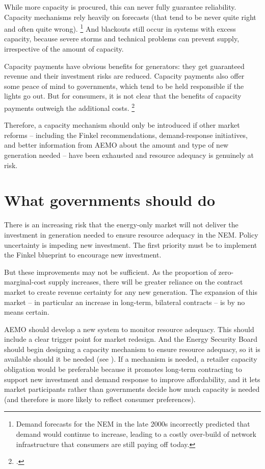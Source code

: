 \documentclass[FrontPage]{grattan}
\begin{document}
While more capacity is procured, this can never fully guarantee reliability. Capacity mechanisms rely heavily on forecasts (that tend to be never quite right and often quite wrong).%
\footnote{\eg{} Demand forecasts for the NEM in the late 2000s incorrectly predicted that demand would continue to increase, leading to a costly over-build of network infrastructure that consumers are still paying off today.}
And blackouts still occur in systems with excess capacity, because severe storms and technical problems can prevent supply, irrespective of the amount of capacity.

Capacity payments have obvious benefits for generators: they get guaranteed revenue and their investment risks are reduced. Capacity payments also offer some peace of mind to governments, which tend to be held responsible if the lights go out. But for consumers, it is not clear that the benefits of capacity payments outweigh the additional costs.%
\footcites{CIGRE2016CapacityMechanisms}{NewberyGrubb2014SecurityOfSupply}{Oxford2016ElectricityMarketsBroken}

Therefore, a capacity mechanism should only be introduced if other market reforms -- including the Finkel recommendations, demand-response initiatives, and better information from AEMO about the amount and type of new generation needed -- have been exhausted and resource adequacy is genuinely at risk.


\chapter{What governments should do}\label{chap:what-governments-should-do}
There is an increasing risk that the energy-only market will not deliver the investment in generation needed to ensure resource adequacy in the NEM\@. Policy uncertainty is impeding new investment. The first priority must be to implement the Finkel blueprint to encourage new investment. 

But these improvements may not be sufficient. As the proportion of zero-marginal-cost supply increases, there will be greater reliance on the contract market to create revenue certainty for any new generation. The expansion of this market -- in particular an increase in long-term, bilateral contracts -- is by no means certain. 

AEMO should develop a new system to monitor resource adequacy. This should include a clear trigger point for market redesign. And the Energy Security Board should begin designing a capacity mechanism to ensure resource adequacy, so it is available should it be needed (see ). If a mechanism is needed, a retailer capacity obligation would be preferable because it promotes long-term contracting to support new investment and demand response to improve affordability, and it lets market participants rather than governments decide how much capacity is needed (and therefore is more likely to reflect consumer preferences).
\end{document}
